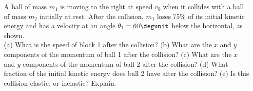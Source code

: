 A ball of mass $m_1$ is moving to the right at speed $v_0$ when it
collides with a ball of mass $m_2$ initially at rest. After the
collision, $m_1$ loses 75\% of its initial kinetic energy and has
a velocity at an angle $\theta_1 = 60\degunit$ below the
horizontal, as shown.\\
%
(a) What is the speed of block 1 after the collision?\answercheck\hwendpart
%
(b) What are the $x$ and $y$ components of the momentum of ball 1
after the collision?\answercheck\hwendpart
%
(c) What are the $x$ and $y$ components of the momentum of ball 2
after the collision?\answercheck\hwendpart
%
(d) What fraction of the initial kinetic energy does ball 2 have
after the collision?\answercheck\hwendpart
%
(e) Is this collision elastic, or inelastic? Explain.
